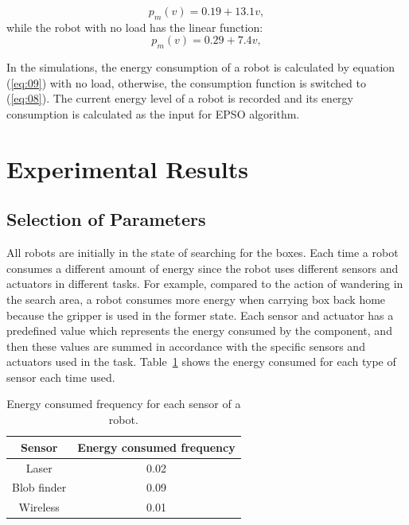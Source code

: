 \documentclass[journal]{IEEEtran}
\begin{document}
\begin{equation}
p_m(v) = 0.19 + 13.1v,
\label{eq:08}
\end{equation}
%
while the robot with no load has the linear function:
%
\begin{equation}
p_m(v) = 0.29 + 7.4v,
\label{eq:09}
\end{equation}

In the simulations, the energy consumption of a robot is calculated by equation (\ref{eq:09}) with no load, otherwise, the consumption function is switched to (\ref{eq:08}). The current energy level of a robot is recorded and its energy consumption is calculated as the input for EPSO algorithm.

\section{Experimental Results}
\label{sec:4}
\subsection{Selection of Parameters}
\label{subsec:1}
All robots are initially in the state of searching for the boxes. Each time a robot consumes a different amount of energy since the robot uses different sensors and actuators in different tasks. For example, compared to the action of wandering in the search area, a robot consumes more energy when carrying box back home because the gripper is used in the former state. Each sensor and actuator has a predefined value which represents the energy consumed by the component, and then these values are summed in accordance with the specific sensors and actuators used in the task. Table~\ref{tab:1} shows the energy consumed for each type of sensor each time used.

\begin{table}[!t]
\renewcommand{\arraystretch}{1.3}
\caption{Energy consumed frequency for each sensor of a robot.}
\label{tab:1}
\centering
\begin{tabular}{|c||c|}
\hline
Sensor & Energy consumed frequency\\
\hline
Laser & 0.02\\
\hline
Blob finder & 0.09\\
\hline
Wireless & 0.01\\
\hline
\end{tabular}
\end{table}
\end{document}
